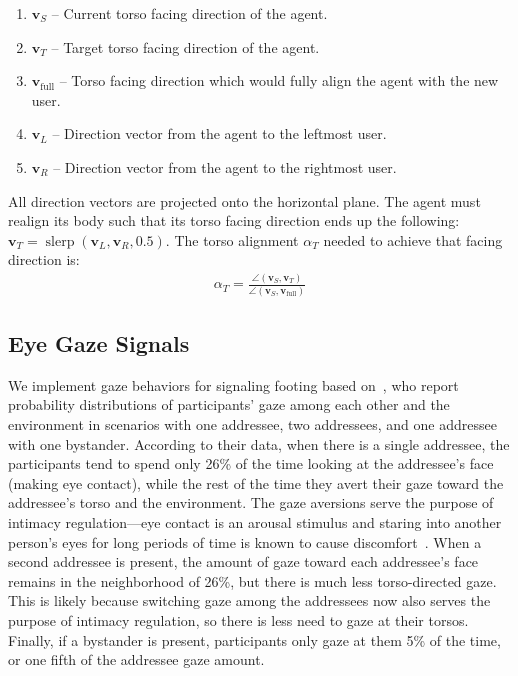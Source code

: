 \begin{enumerate}
\item $\mathbf{v}_S$ -- Current torso facing direction of the agent.
\item $\mathbf{v}_T$ -- Target torso facing direction of the agent.
\item $\mathbf{v}_\mathrm{full}$ -- Torso facing direction which would fully align the agent with the new user.
\item $\mathbf{v}_L$ -- Direction vector from the agent to the leftmost user.
\item $\mathbf{v}_R$ -- Direction vector from the agent to the rightmost user.
\end{enumerate}

All direction vectors are projected onto the horizontal plane. The agent must realign its body such that its torso facing direction ends up the following: $\mathbf{v}_T = \mathop{slerp}(\mathbf{v}_L, \mathbf{v}_R, 0.5)$. The torso alignment $\alpha_T$ needed to achieve that facing direction is:
%
\begin{align} \label{eq:FTorsoAlign}
\alpha_T = \frac{\angle(\mathbf{v}_S, \mathbf{v}_T)}{\angle(\mathbf{v}_S, \mathbf{v}_\mathrm{full})}
\end{align}
%

\subsection{Eye Gaze Signals}

We implement gaze behaviors for signaling footing based on~\citet{mutlu2012conversational}, who report probability distributions of participants' gaze among each other and the environment in scenarios with one addressee, two addressees, and one addressee with one bystander. According to their data, when there is a single addressee, the participants tend to spend only 26\% of the time looking at the addressee's face (making eye contact), while the rest of the time they avert their gaze toward the addressee's torso and the environment. The gaze aversions serve the purpose of intimacy regulation---eye contact is an arousal stimulus and staring into another person's eyes for long periods of time is known to cause discomfort~\citep{argyle1976gaze}. When a second addressee is present, the amount of gaze toward each addressee's face remains in the neighborhood of 26\%, but there is much less torso-directed gaze. This is likely because switching gaze among the addressees now also serves the purpose of intimacy regulation, so there is less need to gaze at their torsos. Finally, if a bystander is present, participants only gaze at them 5\% of the time, or one fifth of the addressee gaze amount.

